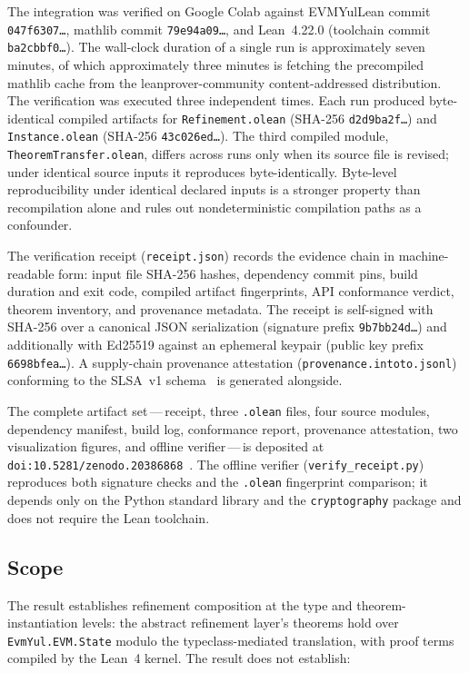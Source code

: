 \documentclass[11pt,a4paper]{article}
\begin{document}
The integration was verified on Google Colab against EVMYulLean commit \texttt{047f6307\ldots}, mathlib commit \texttt{79e94a09\ldots}, and Lean~4.22.0 (toolchain commit \texttt{ba2cbbf0\ldots}). The wall-clock duration of a single run is approximately seven minutes, of which approximately three minutes is fetching the precompiled mathlib cache from the leanprover-community content-addressed distribution. The verification was executed three independent times. Each run produced byte-identical compiled artifacts for \texttt{Refinement.olean} (SHA-256 \texttt{d2d9ba2f\ldots}) and \texttt{Instance.olean} (SHA-256 \texttt{43c026ed\ldots}). The third compiled module, \texttt{TheoremTransfer.olean}, differs across runs only when its source file is revised; under identical source inputs it reproduces byte-identically. Byte-level reproducibility under identical declared inputs is a stronger property than recompilation alone and rules out nondeterministic compilation paths as a confounder.

The verification receipt (\texttt{receipt.json}) records the evidence chain in machine-readable form: input file SHA-256 hashes, dependency commit pins, build duration and exit code, compiled artifact fingerprints, API conformance verdict, theorem inventory, and provenance metadata. The receipt is self-signed with SHA-256 over a canonical JSON serialization (signature prefix \texttt{9b7bb24d\ldots}) and additionally with Ed25519 against an ephemeral keypair (public key prefix \texttt{6698bfea\ldots}). A supply-chain provenance attestation (\texttt{provenance.intoto.jsonl}) conforming to the SLSA~v1 schema~\cite{slsa-v1} is generated alongside.

The complete artifact set\,---\,receipt, three \texttt{.olean} files, four source modules, dependency manifest, build log, conformance report, provenance attestation, two visualization figures, and offline verifier\,---\,is deposited at \texttt{doi:10.5281/zenodo.20386868}~\cite{duncan2026parallax5verification}. The offline verifier (\texttt{verify\_receipt.py}) reproduces both signature checks and the \texttt{.olean} fingerprint comparison; it depends only on the Python standard library and the \texttt{cryptography} package and does not require the Lean toolchain.

\subsection{Scope}

The result establishes refinement composition at the type and theorem-instantiation levels: the abstract refinement layer's theorems hold over \texttt{EvmYul.EVM.State} modulo the typeclass-mediated translation, with proof terms compiled by the Lean~4 kernel. The result does not establish:
\end{document}
